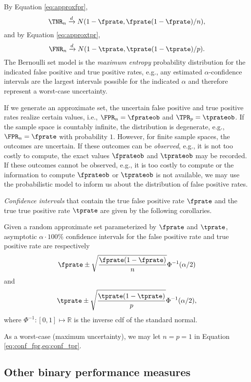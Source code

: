 \documentclass[
]{article}
\begin{document}
By Equation \ref{eq:approxfpr}, \[
\TNR_n \xrightarrow{d} N(1-\fprate, \fprate(1-\fprate) / n),
\] and by Equation \ref{eq:approxtpr}, \[
\FNR_n \xrightarrow{d} N(1-\tprate, \tprate(1-\tprate) / p).
\] The Bernoulli set model is the \emph{maximum entropy} probability
distribution for the indicated false positive and true positive rates,
e.g., any estimated \(\alpha\)-confidence intervals are the largest
intervals possible for the indicated \(\alpha\) and therefore represent
a worst-case uncertainty.

If we generate an approximate set, the uncertain false positive and true
positive rates realize certain values, i.e., \(\FPR_n = \fprateob\) and
\(\TPR_p = \tprateob\). If the sample space is countably infinite, the
distribution is degenerate, e.g., \(\FPR_n = \fprate\) with probability
\(1\). However, for finite sample spaces, the outcomes are uncertain. If
these outcomes can be \emph{observed}, e.g., it is not too costly to
compute, the exact values \(\fprateob\) and \(\tprateob\) may be
recorded. If these outcomes cannot be observed, e.g., it is too costly
to compute or the information to compute \(\fprateob\) or \(\tprateob\)
is not available, we may use the probabilistic model to inform us about
the distribution of false positive rates.

\emph{Confidence intervals} that contain the true false positive rate
\(\fprate\) and the true true positive rate \(\tprate\) are given by the
following corollaries.

\begin{theorem}
Given a random approximate set parameterized by $\fprate$ and $\tprate$,
asymptotic $\alpha \cdot 100\%$ confidence intervals for the false positive rate
and true positive rate are respectively
\begin{equation}
\label{eq:conf_fpr}
\fprate \pm \sqrt{\frac{\fprate(1-\fprate)}{n}} \Phi^{-1}(\alpha/2)
\end{equation}
and
\begin{equation}
\label{eq:conf_tpr}
\tprate \pm \sqrt{\frac{\tprate(1-\tprate)}{p}} \Phi^{-1}(\alpha/2),
\end{equation}
where $\Phi^{-1} : [0,1] \mapsto \mathbb{R}$ is the inverse cdf of the standard
normal.
\end{theorem}

As a worst-case (maximum uncertainty), we may let \(n = p = 1\) in
Equation \ref{eq:conf_fpr,eq:conf_tpr}.

\hypertarget{sec:perf}{%
\subsection{Other binary performance measures}\label{sec:perf}}
\end{document}
